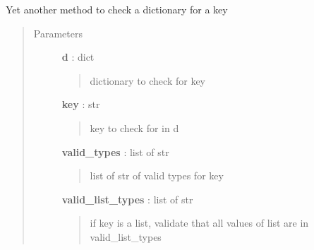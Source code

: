 \documentclass[letterpaper,10pt,english]{sphinxmanual}
\begin{document}
\begin{fulllineitems}
\label{pytan.utils:pytan.utils.check_dictkey}
Yet another method to check a dictionary for a key
\begin{quote}\begin{description}
\item[{Parameters}] \leavevmode
\textbf{d} : dict
\begin{quote}

dictionary to check for key
\end{quote}

\textbf{key} : str
\begin{quote}

key to check for in d
\end{quote}

\textbf{valid\_types} : list of str
\begin{quote}

list of str of valid types for key
\end{quote}

\textbf{valid\_list\_types} : list of str
\begin{quote}

if key is a list, validate that all values of list are in valid\_list\_types
\end{quote}

\end{description}\end{quote}

\end{fulllineitems}

\end{document}
